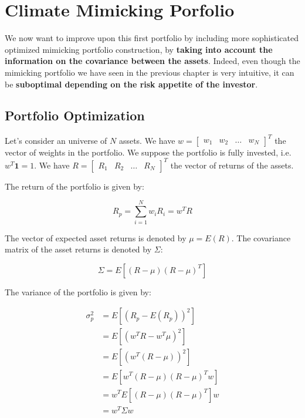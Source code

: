\chapter{Climate Mimicking Porfolio}
 
We now want to improve upon this first portfolio 
by including more sophisticated optimized mimicking 
portfolio construction, by \textbf{taking into account 
the information on the covariance between the 
assets}. Indeed, even though the mimicking portfolio we have 
seen in the previous chapter is very intuitive, 
it can be \textbf{suboptimal depending on the 
risk appetite of the investor}.

\section{Portfolio Optimization}

Let's consider an universe of $N$ assets. 
We have $w = \begin{bmatrix}
    w_1 & w_2 & \ldots & w_N
\end{bmatrix}^T$ the vector of weights in the
portfolio.
We suppose the portfolio is fully invested, i.e.
$w^T \mathbf{1} = 1$.
We have $R = \begin{bmatrix}
    R_1 & R_2 & \ldots & R_N
\end{bmatrix}^T$ the vector of returns of the assets.

The return of the portfolio is given by:

\begin{equation}
    R_p = \sum^N_{i=1} w_i R_i = w^T R
\end{equation}

The vector of expected asset returns is denoted by $\mu = E(R)$.
The covariance matrix of the asset returns is denoted by $\Sigma$:

\begin{equation}
    \Sigma = E[(R - \mu)(R - \mu)^T]
\end{equation}

The variance of the portfolio is given by:

\begin{equation}
    \begin{aligned}
        \sigma^2_p &= E[(R_p - E(R_p))^2] \\
        &= E[(w^T R - w^T \mu)^2] \\
        &= E[(w^T (R - \mu))^2] \\
        &= E[w^T (R - \mu)(R - \mu)^T w] \\
        &= w^T E[(R - \mu)(R - \mu)^T] w \\
        &= w^T \Sigma w
    \end{aligned}
\end{equation}


